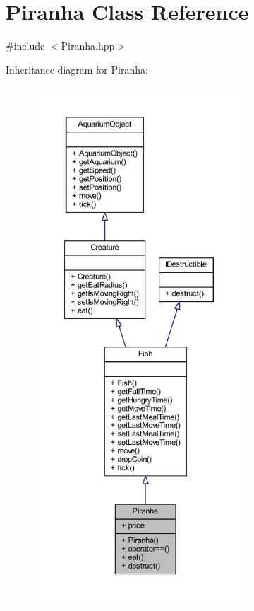 \hypertarget{class_piranha}{}\section{Piranha Class Reference}
\label{class_piranha}


{\ttfamily \#include $<$Piranha.\+hpp$>$}



Inheritance diagram for Piranha\+:\nopagebreak
\begin{figure}[H]
\begin{center}
\leavevmode
\includegraphics[height=550pt]{class_piranha__inherit__graph}
\end{center}
\end{figure}



